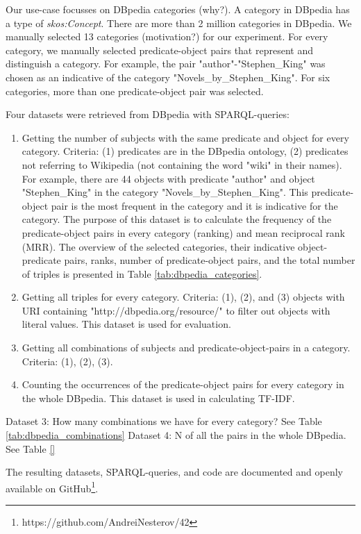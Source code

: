 \noindent
Our use-case focusses on DBpedia categories (why?). A category in DBpedia has a type of \textit{skos:Concept}.
There are more than 2 million categories in DBpedia. We manually selected 13 categories (motivation?) for our experiment.
For every category, we manually selected predicate-object pairs that represent and distinguish a category.
For example, the pair "author"-"Stephen\_King" was chosen as an indicative of the category "Novels\_by\_Stephen\_King".
For six categories, more than one predicate-object pair was selected. 

Four datasets were retrieved from DBpedia with SPARQL-queries:
\begin{enumerate}
\item Getting the number of subjects with the same predicate and object for every category.
Criteria: (1) predicates are in the DBpedia ontology, (2) predicates not referring to Wikipedia (not containing the word "wiki" in their names).
For example, there are 44 objects with predicate "author" and object "Stephen\_King" in the category "Novels\_by\_Stephen\_King".
This predicate-object pair is the most frequent in the category and it is indicative for the category.
The purpose of this dataset is to calculate the frequency of the predicate-object pairs in every category (ranking) and mean reciprocal rank (MRR).
The overview of the selected categories, their indicative object-predicate pairs, ranks, number of predicate-object pairs, and the total number of triples is presented in Table \ref{tab:dbpedia_categories}.
\item  Getting all triples for every category. Criteria: (1), (2), and (3) objects with URI containing "http://dbpedia.org/resource/" to filter out objects with literal values.
This dataset is used for evaluation.
\item Getting all combinations of subjects and predicate-object-pairs in a category.
Criteria: (1), (2), (3).
\item Counting the occurrences of the predicate-object pairs for every category in the whole DBpedia.
This dataset is used in calculating TF-IDF.
\end{enumerate}

Dataset 3: How many combinations we have for every category? See Table \ref{tab:dbpedia_combinations}
Dataset 4: N of all the pairs in the whole DBpedia. See Table \ref{}

The resulting datasets, SPARQL-queries, and code are documented and openly available on GitHub\footnote{https://github.com/AndreiNesterov/42}.


